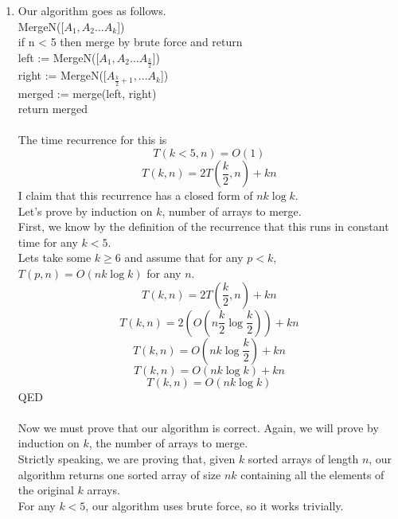 \documentclass[11pt]{article}
\begin{document}
\begin{solution}
    \begin{enumerate}
        \item Our algorithm goes as follows. \\
            MergeN([$A_1, A_2 \ldots A_k$]) \\
            if n < 5 then merge by brute force and return \\
            left := MergeN([$A_1, A_2 \ldots A_{\frac{k}{2}}$]) \\
            right := MergeN([$A_{\frac{k}{2} + 1}, \ldots A_k$]) \\
            merged := merge(left, right) \\
            return merged \\
            \\
            The time recurrence for this is 
            \[
                T(k < 5, n) = O(1) 
            \]
            \[
                T(k, n) = 2T\left(\frac{k}{2}, n\right) + kn
            \]
            I claim that this recurrence has a closed form of $nk \log k$. \\
            Let's prove by induction on $k$, number of arrays to merge. \\
            First, we know by the definition of the recurrence that this runs in constant time for any $k < 5$. \\
            Lets take some $k \geq 6$ and assume that for any $p < k$, $T(p, n) = O(nk \log k)$ for any $n$.
            \[
                T(k, n) = 2T\left(\frac{k}{2}, n\right) + kn
            \]
            \[
                T(k, n) = 2\left(O\left(n\frac{k}{2} \log \frac{k}{2}\right)\right) + kn
            \]
            \[
                T(k, n) = O\left(nk \log \frac{k}{2}\right) + kn
            \]
            \[
                T(k, n) = O\left(nk \log k\right) + kn
            \]
            \[
                T(k, n) = O\left(nk \log k\right)
            \]
            QED \\
            \\
            Now we must prove that our algorithm is correct. Again, we will prove by induction on $k$, the number of arrays to merge. \\
            Strictly speaking, we are proving that, given $k$ sorted arrays of length $n$, our algorithm returns one sorted array of size $nk$ containing all the elements of the original $k$ arrays. \\
            For any $k < 5$, our algorithm uses brute force, so it works trivially. \\

\end{enumerate}
\end{solution}
\end{document}
